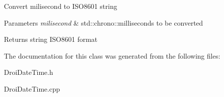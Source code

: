 Convert milisecond to I\+S\+O8601 string 
\begin{DoxyParams}{Parameters}
{\em milisecond} & std\+::chrono\+::milliseconds to be converted \\
\hline
\end{DoxyParams}
\begin{DoxyReturn}{Returns}
string I\+S\+O8601 format 
\end{DoxyReturn}


The documentation for this class was generated from the following files\+:\begin{DoxyCompactItemize}
\item 
Droi\+Date\+Time.\+h\item 
Droi\+Date\+Time.\+cpp\end{DoxyCompactItemize}
